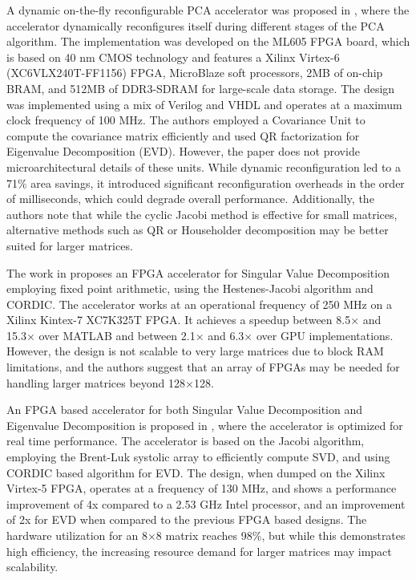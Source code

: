 A dynamic on-the-fly reconfigurable PCA accelerator was proposed in \cite{pca_architecture-5}, where the accelerator dynamically reconfigures itself during different stages of the PCA algorithm. The implementation was developed on the ML605 FPGA board, which is based on 40 nm CMOS technology and features a Xilinx Virtex-6 (XC6VLX240T-FF1156) FPGA, MicroBlaze soft processors, 2MB of on-chip BRAM, and 512MB of DDR3-SDRAM for large-scale data storage. The design was implemented using a mix of Verilog and VHDL and operates at a maximum clock frequency of 100 MHz. The authors employed a Covariance Unit to compute the covariance matrix efficiently and used QR factorization for Eigenvalue Decomposition (EVD). However, the paper does not provide microarchitectural details of these units. While dynamic reconfiguration led to a 71\% area savings, it introduced significant reconfiguration overheads in the order of milliseconds, which could degrade overall performance. Additionally, the authors note that while the cyclic Jacobi method is effective for small matrices, alternative methods such as QR or Householder decomposition may be better suited for larger matrices.


The work in \cite{svd_architecture-1} proposes an FPGA accelerator for Singular Value Decomposition employing fixed point arithmetic, using the Hestenes-Jacobi algorithm and CORDIC. The accelerator works at an operational frequency of 250 MHz on a Xilinx Kintex-7 XC7K325T FPGA. It achieves a speedup between 8.5× and 15.3× over MATLAB and between 2.1× and 6.3× over GPU implementations. However, the design is not scalable to very large matrices due to block RAM limitations, and the authors suggest that an array of FPGAs may be needed for handling larger matrices beyond 128×128. 

An FPGA based accelerator for both Singular Value Decomposition and Eigenvalue Decomposition is proposed in \cite{svd_architecture-2}, where the accelerator is optimized for real time performance. The accelerator is based on the Jacobi algorithm, employing the Brent-Luk systolic array to efficiently compute SVD, and using CORDIC based algorithm for EVD. The design, when dumped on the Xilinx Virtex-5 FPGA, operates at a frequency of 130 MHz, and shows a performance improvement of 4x compared to a 2.53 GHz Intel processor, and an improvement of 2x for EVD when compared to the previous FPGA based designs. The hardware utilization for an 8×8 matrix reaches 98\%, but while this demonstrates high efficiency, the increasing resource demand for larger matrices may impact scalability. 


